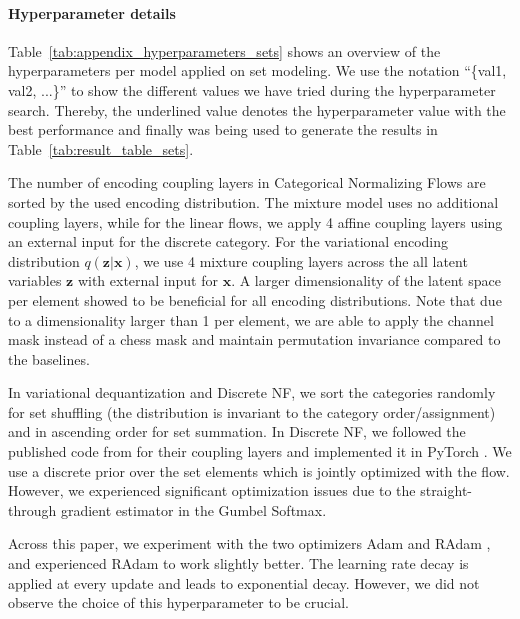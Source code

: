 \paragraph{Hyperparameter details} Table~\ref{tab:appendix_hyperparameters_sets} shows an overview of the hyperparameters per model applied on set modeling. We use the notation ``\{val1, val2, ...\}'' to show the different values we have tried during the hyperparameter search. Thereby, the underlined value denotes the hyperparameter value with the best performance and finally was being used to generate the results in Table~\ref{tab:result_table_sets}. 

The number of encoding coupling layers in Categorical Normalizing Flows are sorted by the used encoding distribution. The mixture model uses no additional coupling layers, while for the linear flows, we apply 4 affine coupling layers using an external input for the discrete category. For the variational encoding distribution $q(\bm{z}|\bm{x})$, we use 4 mixture coupling layers across the all latent variables $\bm{z}$ with external input for $\bm{x}$. A larger dimensionality of the latent space per element showed to be beneficial for all encoding distributions. Note that due to a dimensionality larger than 1 per element, we are able to apply the channel mask instead of a chess mask and maintain permutation invariance compared to the baselines.

In variational dequantization and Discrete NF, we sort the categories randomly for set shuffling (the distribution is invariant to the category order/assignment) and in ascending order for set summation. In Discrete NF, we followed the published code from \citet{TranDiscreteFlows} for their coupling layers and implemented it in PyTorch \cite{PyTorch}. We use a discrete prior over the set elements which is jointly optimized with the flow. However, we experienced significant optimization issues due to the straight-through gradient estimator in the Gumbel Softmax. 

Across this paper, we experiment with the two optimizers Adam \cite{Adam} and RAdam \cite{RAdam}, and experienced RAdam to work slightly better. The learning rate decay is applied at every update and leads to exponential decay. However, we did not observe the choice of this hyperparameter to be crucial.

